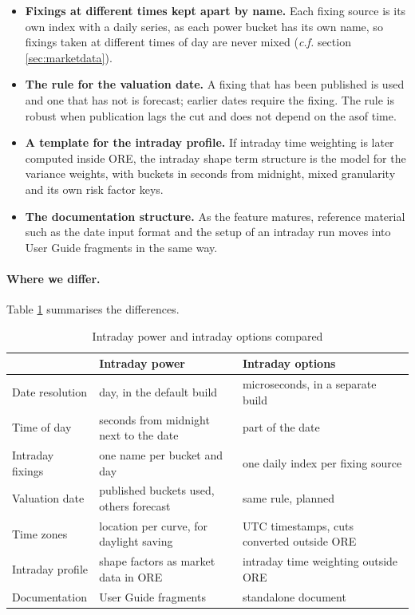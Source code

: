 \documentclass[12pt, a4paper]{article}
\begin{document}
\begin{itemize}
\item \textbf{Fixings at different times kept apart by name.} Each fixing source is its own index with a daily
  series, as each power bucket has its own name, so fixings taken at different times of day are never mixed (\textit{c.f.}
  section \ref{sec:marketdata}).
\item \textbf{The rule for the valuation date.} A fixing that has been published is used and one that has not is
  forecast; earlier dates require the fixing. The rule is robust when publication lags the cut and does not
  depend on the asof time.
\item \textbf{A template for the intraday profile.} If intraday time weighting is later computed inside ORE, the intraday
  shape term structure is the model for the variance weights, with buckets in seconds from midnight, mixed granularity
  and its own risk factor keys.
\item \textbf{The documentation structure.} As the feature matures, reference material such as the date input format
  and the setup of an intraday run moves into User Guide fragments in the same way.
\end{itemize}

\paragraph*{Where we differ.} Table \ref{tab:comparison} summarises the differences.

\begin{table}[H]
\centering
\begin{tabular}{|>{\raggedright\arraybackslash}p{3cm}|>{\raggedright\arraybackslash}p{5.5cm}|>{\raggedright\arraybackslash}p{5.5cm}|}
\hline
 & Intraday power & Intraday options \\
\hline
Date resolution & day, in the default build & microseconds, in a separate build \\
\hline
Time of day & seconds from midnight next to the date & part of the date \\
\hline
Intraday fixings & one name per bucket and day & one daily index per fixing source \\
\hline
Valuation date & published buckets used, others forecast & same rule, planned \\
\hline
Time zones & location per curve, for daylight saving & UTC timestamps, cuts converted outside ORE \\
\hline
Intraday profile & shape factors as market data in ORE & intraday time weighting outside ORE \\
\hline
Documentation & User Guide fragments & standalone document \\
\hline
\end{tabular}
\caption{Intraday power and intraday options compared}
\label{tab:comparison}
\end{table}
\end{document}

